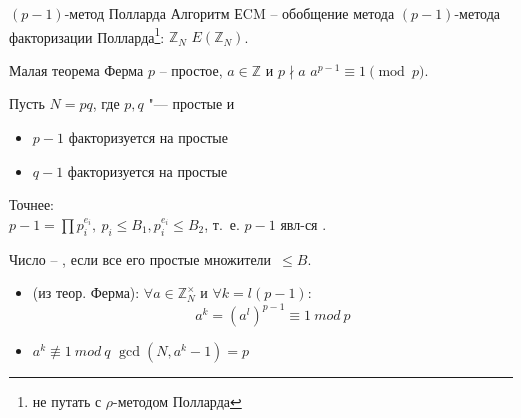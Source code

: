 \documentclass{beamer}
\begin{document}
\begin{frame}{$(p-1)$-метод Полларда}
    Алгоритм ЕCM -- обобщение метода $(p-1)$-метода факторизации Полларда\footnote{не путать с $\rho$-методом Полларда}: $\mathbb{Z}_N$ \MyImplies $E(\mathbb{Z}_N)$.

    \vspace{1em}
    \begin{block}{Малая теорема Ферма}
        $p$ -- простое, $a \in \mathbb{Z}$ и $p \nmid a$ \MyImplies $a^{p-1} \equiv 1 \pmod{p}$.
    \end{block}    
\end{frame}

\begin{frame}%
Пусть $N = p q$, где $p, q$ "--- простые и
\begin{itemize}
  \item $p-1$ факторизуется на  простые\\
  \item $q-1$  факторизуется на  простые
\end{itemize}

\vspace{1em}
Точнее:\\
$p-1 = \prod p_i^{e_i},\ p_i \leq B_1, p_i^{e_i} \leq B_2$, т.~е. $p-1$ явл-ся .

\vspace{1em}
Число -- , если все его простые множители~$\leq B$.


\vspace{1em}
\begin{itemize}
    \item (из теор. Ферма): $\forall a \in \mathbb{Z}_N^\times$ и $\forall k = l (p-1)$:
    \[
    a^k = (a^l)^{p-1} \equiv 1\ mod\ p
    \]
    \item $a^k \not\equiv 1\ mod\ q$ \structure{$\implies$} $\gcd(N, a^k - 1) = p$
\end{itemize}
\end{frame}
\end{document}
